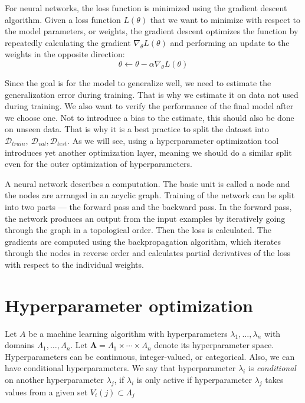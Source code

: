 For neural networks, the loss function is minimized using the gradient descent algorithm. Given a loss function $L(\theta)$ that we want to minimize with respect to the model parameters, or weights, the gradient descent optimizes the function by repeatedly calculating the gradient $\nabla_\theta L(\theta)$ and performing an update to the weights in the opposite direction: $$ \theta \leftarrow \theta - \alpha \nabla_\theta L(\theta)$$

Since the goal is for the model to generalize well, we need to estimate the generalization error during training. That is why we estimate it on data not used during training. We also want to verify the performance of the final model after we choose one. Not to introduce a bias to the estimate, this should also be done on unseen data. That is why it is a best practice to split the dataset into $\mathcal{D}_{train}, \  \mathcal{D}_{val}, \mathcal{D}_{test}$. As we will see, using a hyperparameter optimization tool introduces yet another optimization layer, meaning we should do a similar split even for the outer optimization of hyperparameters.

A neural network describes a computation. The basic unit is called a node and the nodes are arranged in an acyclic graph. Training of the network can be split into two parts --- the forward pass and the backward pass. In the forward pass, the network produces an output from the input examples by iteratively going through the graph in a topological order. Then the loss is calculated. The gradients are computed using the backpropagation algorithm, which iterates through the nodes in reverse order and calculates partial derivatives of the loss with respect to the individual weights.



\section{Hyperparameter optimization}

Let $A$ be a machine learning algorithm with hyperparameters $\lambda_1, \dots , \lambda_n$ with domains $\Lambda_1,\dots , \Lambda_n$. Let $ \mathbf{\Lambda } = \Lambda_1 \times \cdots \times \Lambda_n$ denote its hyperparameter space. Hyperparameters can be continuous, integer-valued, or categorical. Also, we can have conditional hyperparameters. We say that hyperparameter $\lambda_i$ is \emph{conditional} on another hyperparameter $\lambda_j$, if $\lambda_i$ is only active if hyperparameter $\lambda_j$ takes values from a given set $V_i(j) \subset \Lambda_j$

